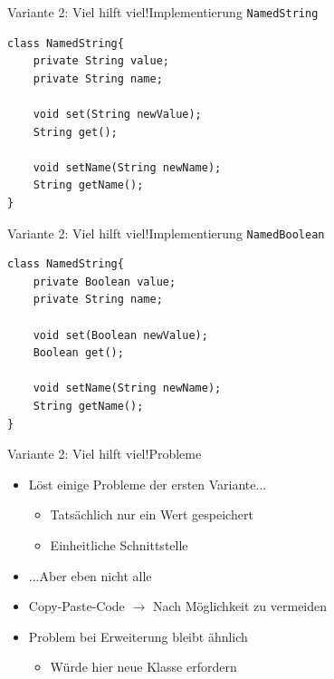 \begin{frame}[fragile]{Variante 2: Viel hilft viel!}{Implementierung \texttt{NamedString}}
\lstset{style=java}
\begin{lstlisting}
class NamedString{
    private String value;
    private String name;
    
    void set(String newValue);
    String get();
    
    void setName(String newName);
    String getName();
}
\end{lstlisting}
\end{frame}

\begin{frame}[fragile]{Variante 2: Viel hilft viel!}{Implementierung \texttt{NamedBoolean}}
\lstset{style=java}
\begin{lstlisting}
class NamedString{
    private Boolean value;
    private String name;
    
    void set(Boolean newValue);
    Boolean get();
    
    void setName(String newName);
    String getName();
}
\end{lstlisting}
\end{frame}

\begin{frame}{Variante 2: Viel hilft viel!}{Probleme}
\begin{itemize}
    \item Löst einige Probleme der ersten Variante...
    \begin{itemize}
        \item Tatsächlich nur ein Wert gespeichert
        \item Einheitliche Schnittstelle
    \end{itemize}
    \item ...Aber eben nicht alle
    \item Copy-Paste-Code $\rightarrow$ Nach Möglichkeit zu vermeiden
    \item Problem bei Erweiterung bleibt ähnlich
    \begin{itemize}
        \item Würde hier neue Klasse erfordern
    \end{itemize}
\end{itemize}
\end{frame}



